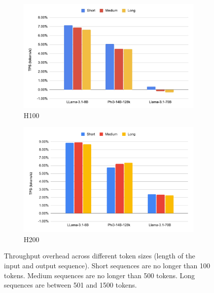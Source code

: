 \documentclass{article}
\begin{document}
\begin{figure}
    \centering
    \begin{subfigure}[b]{0.49\linewidth}
        \centering
        \includegraphics[width=\linewidth]{outputs/h100/tps-vs-token-size.png}
        \caption{H100}
        \label{fig:tps-overhead-vs-token-size-h100}
    \end{subfigure}
    \begin{subfigure}[b]{0.49\linewidth}
        \centering
        \includegraphics[width=\linewidth]{outputs/h200_1c/tps-vs-token-size.pdf}
        \caption{H200}
        \label{fig:tps-overhead-vs-token-size-h200}
    \end{subfigure}
    \caption{Throughput overhead across different token sizes (length of the input and output sequence). Short sequences are no longer than 100 tokens. Medium sequences are no longer than 500 tokens. Long sequences are between 501 and 1500 tokens.}
    \label{fig:tps-overhead-vs-token-size}
\end{figure}
\end{document}
